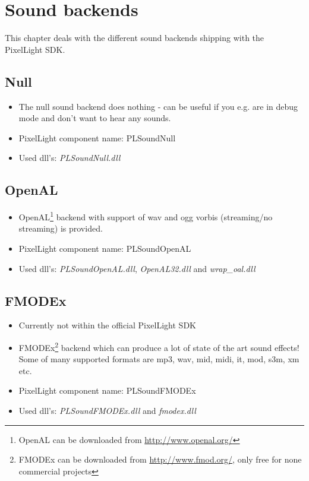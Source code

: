 \chapter{Sound backends}
This chapter deals with the different sound backends shipping with the PixelLight SDK.




\section{Null}
\begin{itemize}
\item The null sound backend does nothing - can be useful if you e.g. are in debug mode and don't want to hear any sounds.
\item PixelLight component name: PLSoundNull
\item Used dll's: \emph{PLSoundNull.dll}
\end{itemize}




\section{OpenAL}
\begin{itemize}
\item OpenAL\footnote{OpenAL can be downloaded from \url{http://www.openal.org/}} backend with support of wav and ogg vorbis (streaming/no streaming) is provided.
\item PixelLight component name: PLSoundOpenAL
\item Used dll's: \emph{PLSoundOpenAL.dll}, \emph{OpenAL32.dll} and \emph{wrap\_oal.dll}
\end{itemize}




\section{FMODEx}
\begin{itemize}
\item Currently not within the official PixelLight SDK
\item FMODEx\footnote{FMODEx can be downloaded from \url{http://www.fmod.org/}, only free for none commercial projects} backend which can produce a lot of state of the art sound effects! Some of many supported formats are mp3, wav, mid, midi, it, mod, s3m, xm etc. 

\item PixelLight component name: PLSoundFMODEx
\item Used dll's: \emph{PLSoundFMODEx.dll} and \emph{fmodex.dll}
\end{itemize}





